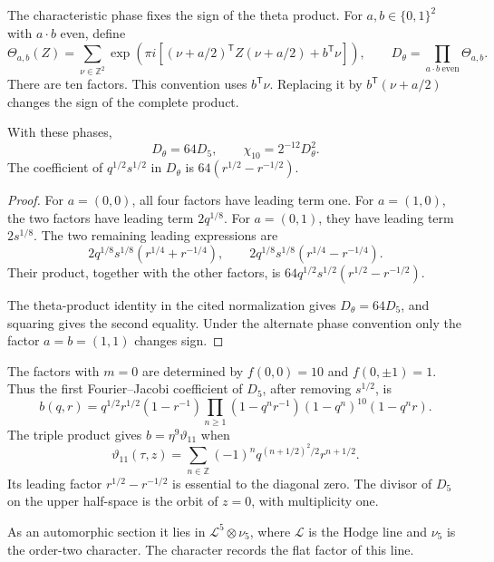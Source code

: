 The characteristic phase fixes the sign of the theta product.
For \(a,b\in\{0,1\}^2\) with \(a\cdot b\) even, define
\[
 \Theta_{a,b}(Z)=
 \sum_{\nu\in\mathbb Z^2}
 \exp\!\left(\pi i\left[
  (\nu+a/2)^{\mathsf T}Z(\nu+a/2)+b^{\mathsf T}\nu\right]\right),
 \qquad D_\theta=\prod_{a\cdot b\ {\mathrm{even}}}\Theta_{a,b}.
\]
There are ten factors. This convention uses \(b^{\mathsf T}\nu\).
Replacing it by \(b^{\mathsf T}(\nu+a/2)\) changes the sign of
the complete product.

\begin{proposition}\label{mht:prop:compact-theta-normalization}
With these phases,
\[
 D_\theta=64D_5,\qquad \chi_{10}=2^{-12}D_\theta^2.
\]
The coefficient of \(q^{1/2}s^{1/2}\) in \(D_\theta\) is
\(64(r^{1/2}-r^{-1/2})\).
\end{proposition}
\begin{proof}
For \(a=(0,0)\), all four factors have leading term one.
For \(a=(1,0)\), the two factors have leading term \(2q^{1/8}\).
For \(a=(0,1)\), they have leading term \(2s^{1/8}\).
The two remaining leading expressions are
\[
 2q^{1/8}s^{1/8}(r^{1/4}+r^{-1/4}),\qquad
 2q^{1/8}s^{1/8}(r^{1/4}-r^{-1/4}).
\]
Their product, together with the other factors, is
\(64q^{1/2}s^{1/2}(r^{1/2}-r^{-1/2})\).

The theta-product identity in the cited normalization gives
\(D_\theta=64D_5\), and squaring gives the second equality.
Under the alternate phase convention only the factor
\(a=b=(1,1)\) changes sign.
\end{proof}

The factors with \(m=0\) are determined by \(f(0,0)=10\) and
\(f(0,\pm1)=1\). Thus the first Fourier--Jacobi coefficient of
\(D_5\), after removing \(s^{1/2}\), is
\begin{equation}\label{mht:eq:compact-boundary-factor}
 b(q,r)=q^{1/2}r^{1/2}(1-r^{-1})
    \prod_{n\geq1}(1-q^nr^{-1})(1-q^n)^{10}(1-q^nr).
\end{equation}
The triple product gives \(b=\eta^9\vartheta_{11}\) when
\[
 \vartheta_{11}(\tau,z)=
 \sum_{n\in\mathbb Z}(-1)^n
    q^{(n+1/2)^2/2}r^{n+1/2}.
\]
Its leading factor \(r^{1/2}-r^{-1/2}\) is essential to the
diagonal zero. The divisor of \(D_5\) on the upper half-space
is the orbit of \(z=0\), with multiplicity one.

As an automorphic section it lies in
\(\mathcal L^5\otimes\nu_5\), where \(\mathcal L\) is the Hodge
line and \(\nu_5\) is the order-two character.
The character records the flat factor of this line.

